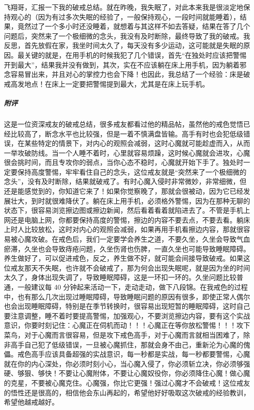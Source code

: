 \begin{case}
    飞翔哥，汇报一下我的破戒总结。就在昨晚，我失眠了，对此本来我是很淡定地保持观心的（因为有过多次失眠的经验了，一般保持观心，一段时间就能睡着），结果，竟然过了一个多小时还没睡着，就想着与其这样不如去答疑，结果在答了几个问题后，突然来了一个极细微的念头，我没有及时断除，最终导致了我的破戒。我反思，首先放假在家，我坐时间太久了，每天没有多少运动，这可能就是失眠的原因。最关键的就是，在用手机的时候我犯了几个错误，首先“在独处时应该把警惕开到最大”，结果我并没有做到，其次，实在不应该躺在床上用手机，因为躺着邪念容易冒出来，并且对心的掌控力也会下降！也因此，我总结了一个经验：床是破戒高发地点！在床上一定要把警惕提到最大，尤其是在床上玩手机。
    \subparagraph{附评} 这是一位资深戒友的破戒总结，很多戒友都看过他的精品帖，虽然他的戒色觉悟已经比较高了，断念水平也比较强，但是一着不慎满盘皆输。高手有时也会犯低级错误，在某些特定的情景下，对内心的观照会减弱，这时心魔就可能趁虚而入，从而一举攻破防线。当一个人睡不着时，心里就容易烦躁，这时候心魔就会进攻，心魔很会挑时间，而且专攻你的弱点，当你心态不稳时，心魔就开始下手了。独处时一定要保持高度警惕，牢牢看住自己的念头，这位戒友就是“突然来了一个极细微的念头”，没有及时断除，结果就破戒了。有时心魔入侵时非常微妙，非常细微，但还是能感觉到的，你知道它来了！如果你觉察晚了，那就会很被动，因为它已经发展壮大，到时就很难降伏了。躺在床上用手机，必须格外警惕，因为在那种无聊的状态下，很容易浏览擦边图或擦边新闻，然后看着看着就陷进去了。不管是手机上网还是电脑上网，你都要保持高度的警惕，擦边的内容不要去点，不要去看。躺床上时人比较放松，这时对内心的观照会减弱，如果再用手机看擦边内容，那就很容易被心魔攻破。在戒色后，我们一定要学会养生之道，不要久坐，久坐会导致气血瘀滞，久坐也会导致痔疮问题，久坐伤肾也伤脾，一直久坐也可能导致睡眠障碍。养生做好了，可以促进戒色，反之，养生做不好，就可能会间接导致破戒。如果这位戒友那天不失眠，也许就不会破戒了，那为何会出现失眠呢，就是因为坐的时间太久了，身体出现失调了，导致睡眠障碍，这是一环扣一环的。久坐问题比较普通，一般建议每 40 分钟起来活动一下，走动走动，做下八段锦。在我戒色的过程中，也有那么几次出现过睡眠障碍，导致睡眠问题的原因有很多，即使正常人偶尔也会出现睡眠障碍，特别是在季节转换时，很容易出现短暂的睡眠障碍，这时自己要注意调整，睡不着时要提高警惕，加强观心，不要浏览擦边内容，要有这个实战意识，你要时刻记住：心魔正在伺机而动！！！心魔正在等你放松警惕！！！攻下菜鸟，对于心魔而言很容易，但是攻下戒色高手，对于心魔而言就相当困难了，除非高手自己犯了低级错误，一旦被心魔抓住，那就会身不由己，重新沦为心魔的傀儡。戒色高手应该具备超强的实战意识，每一秒都是实战，每一秒都要警惕，心魔就在你的内心深处，你必须时刻小心，当心魔入侵了，你必须斩立决，你必须够强硬、够狠、够快！不要让心魔附体，不要让心魔奴役你，你必须降住心魔！做心魔的克星，不要被心魔克住。心魔强，你比它更强！强过心魔才不会破戒！这位戒友的悟性还是很高的，相信他会东山再起的，希望他好好吸取这次破戒的经验教训，希望他越戒越好。
\end{case}

